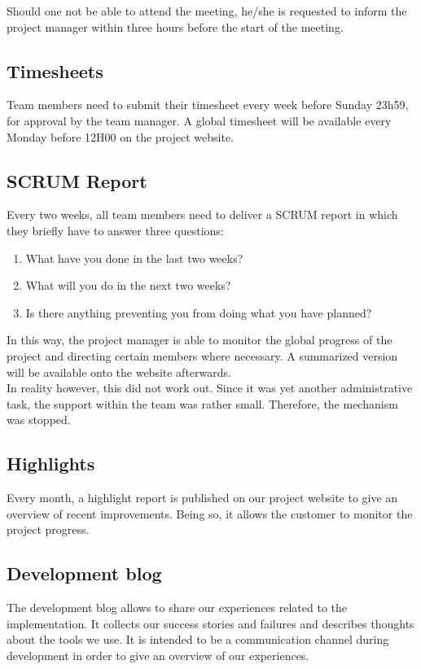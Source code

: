 \documentclass[salesmen, twoside]{../../../templates/latex/2009/softproj}
\begin{document}
\begin{projdoc}
			Should one not be able to attend the meeting, he/she is requested to inform
			the project manager within three hours before the start of the meeting.
			
			\subsection{Timesheets}
			Team members need to submit their timesheet every week before Sunday 23h59, for approval by the team manager.
			A global timesheet will be available every Monday before 12H00 on the project website. 
			
			\subsection{SCRUM Report}
			Every two weeks, all team members need to deliver a SCRUM report in which they briefly have to
			answer three questions:
			
			\begin{enumerate}
				\item What have you done in the last two weeks?
				\item What will you do in the next two weeks?
				\item Is there anything preventing you from doing what you have
				planned?
			\end{enumerate}	
			
			In this way, the project manager is able to monitor the global progress of the project
			and directing certain members where necessary. A summarized version will be available
			onto the website afterwards. \\
			
			In reality however, this did not work out. Since it was yet another administrative task, the support within
			the team was rather small. Therefore, the mechanism was stopped. 
			
			\subsection{Highlights}
			Every month, a highlight report is published on our project website
			to give an overview of recent improvements. Being so, it allows the customer to monitor the project progress. 
			
			\subsection{Development blog}
			The development blog allows to share our experiences related to the implementation. 
			It collects our success stories and failures and describes thoughts about the tools we use. It is intended
			to be a communication channel during development in order to give an overview of our experiences.
			

\end{projdoc}
\end{document}

